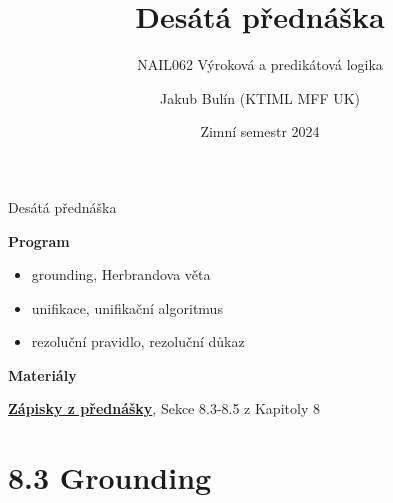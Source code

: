 \documentclass{beamer}
\title{Desátá přednáška}
\subtitle{NAIL062 Výroková a predikátová logika}
\author{Jakub Bulín (KTIML MFF UK)}
\date{Zimní semestr 2024}
\begin{document}
\maketitle


\begin{frame}{Desátá přednáška}

    \textbf{Program}
        \begin{itemize}
            \item grounding, Herbrandova věta
            \item unifikace, unifikační algoritmus
            \item rezoluční pravidlo, rezoluční důkaz
        \end{itemize}    

    \textbf{Materiály}

        \href{https://github.com/jbulin-mff-uk/nail062/raw/main/lecture/lecture-notes/lecture-notes.pdf}{\alert{\textbf{Zápisky z přednášky}}}, Sekce 8.3-8.5 z Kapitoly 8

\end{frame}


\section{8.3 Grounding}
\end{document}
